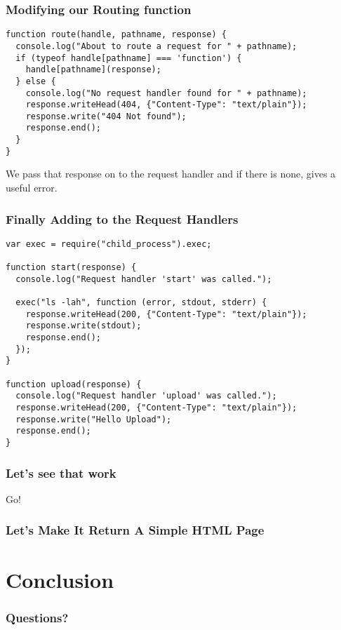 \documentclass[ignorenonframetext,]{beamer}
\begin{document}
\begin{frame}[fragile]\frametitle{Modifying our Routing function}

\begin{verbatim}
function route(handle, pathname, response) {
  console.log("About to route a request for " + pathname);
  if (typeof handle[pathname] === 'function') {
    handle[pathname](response);
  } else {
    console.log("No request handler found for " + pathname);
    response.writeHead(404, {"Content-Type": "text/plain"});
    response.write("404 Not found");
    response.end();
  }
}
\end{verbatim}
We pass that response on to the request handler and if there is none,
gives a useful error.

\end{frame}

\begin{frame}[fragile]\frametitle{Finally Adding to the Request
Handlers}

\begin{verbatim}
var exec = require("child_process").exec;

function start(response) {
  console.log("Request handler 'start' was called.");

  exec("ls -lah", function (error, stdout, stderr) {
    response.writeHead(200, {"Content-Type": "text/plain"});
    response.write(stdout);
    response.end();
  });
}

function upload(response) {
  console.log("Request handler 'upload' was called.");
  response.writeHead(200, {"Content-Type": "text/plain"});
  response.write("Hello Upload");
  response.end();
}
\end{verbatim}
\end{frame}

\begin{frame}\frametitle{Let's see that work}

Go!

\end{frame}

\begin{frame}\frametitle{Let's Make It Return A Simple HTML Page}

\end{frame}

\section{Conclusion}

\begin{frame}\frametitle{Questions?}

\end{frame}
\end{document}
